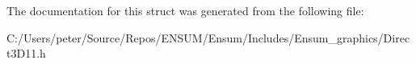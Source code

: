 The documentation for this struct was generated from the following file\+:\begin{DoxyCompactItemize}
\item 
C\+:/\+Users/peter/\+Source/\+Repos/\+E\+N\+S\+U\+M/\+Ensum/\+Includes/\+Ensum\+\_\+graphics/Direct3\+D11.\+h\end{DoxyCompactItemize}
